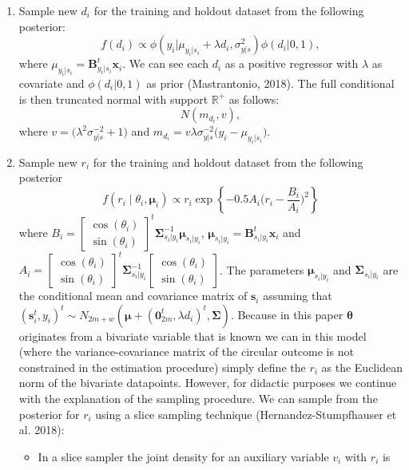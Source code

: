 \documentclass[12pt,]{article}
\begin{document}
\begin{enumerate}
\item Sample new $d_i$ for the training and holdout dataset from the following posterior:
$$f(d_i) \propto \phi(y_i|\mu_{y_i|s_i} + \lambda d_i, \sigma^2_{y|s})\phi(d_i|0, 1),$$
where $\mu_{y_i|s_i} = \boldsymbol{B}_{y_i|s_i}^t\boldsymbol{x}_i$. We can see each $d_i$ as a positive regressor with $\lambda$ as covariate and $\phi(d_i|0, 1)$ as prior (Mastrantonio, 2018). The full conditional is then truncated normal with support $\mathbb{R}^{+}$ as follows:
$$N(m_{d_i}, v),$$ 
\noindent where $v = \big(\lambda^2\sigma^{-2}_{y|s} + 1\big)$ and $m_{d_i} = v\lambda\sigma^{-2}_{y|s}\big(y_i - \mu_{y_i|s_i}\big)$. 
\item Sample new $r_i$ for the training and holdout dataset from the following posterior
$$f(r_i \mid \theta_i, \boldsymbol{\mu}_i) \propto r_i \exp{\left\{-0.5A_i\bigg(r_i-\frac{B_i}{A_i}\bigg)^2\right\}}$$ 
where $B_i = \begin{bmatrix} \cos (\theta_i) \\ \sin (\theta_i)\end{bmatrix}^t\boldsymbol{\Sigma}_{s_i|y_i}^{-1}\boldsymbol{\mu}_{s_i|y_i}$, $\boldsymbol{\mu}_{s_i|y_i} = \boldsymbol{B}_{s_i|y_i}^t\boldsymbol{x}_i$ and $A_i = \begin{bmatrix} \cos (\theta_i) \\ \sin (\theta_i)\end{bmatrix}^t\boldsymbol{\Sigma}_{s_i| y_i}^{-1}\begin{bmatrix} \cos (\theta_i) \\ \sin (\theta_i)\end{bmatrix}$. The parameters $\boldsymbol{\mu}_{s_i|y_i}$ and $\boldsymbol{\Sigma}_{s_i| y_i}$ are the conditional mean and covariance matrix of $\boldsymbol{s}_i$ assuming that $(\boldsymbol{s}_i^t, y_i)^t \sim N_{2m+w}(\boldsymbol{\mu} + (\boldsymbol{0}_{2m}^t, \lambda d_i)^t, \boldsymbol{\Sigma})$. 
Because in this paper $\boldsymbol{\theta}$ originates from a bivariate variable that is known we can in this model (where the variance-covariance matrix of the circular outcome is not constrained in the estimation procedure) simply define the $r_i$ as the Euclidean norm of the bivariate datapoints. However, for didactic purposes we continue with the explanation of the sampling procedure. We
can sample from the posterior for $r_i$ using a slice sampling technique (Hernandez-Stumpfhauser et al. 2018): 
\begin{itemize}
\item In a slice sampler the joint density for an auxiliary variable $v_{i}$ with $r_{i}$ is

\end{itemize}
\end{enumerate}
\end{document}
